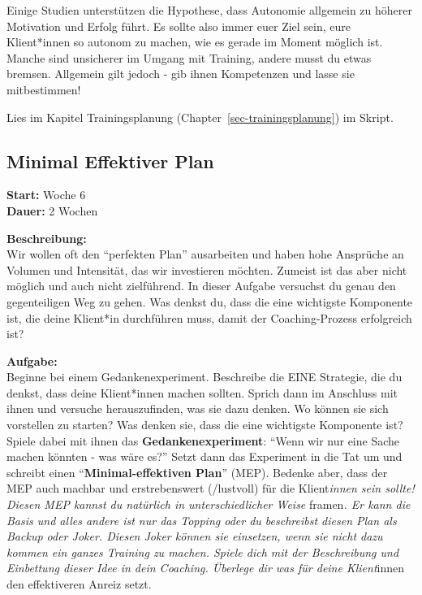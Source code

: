 \documentclass[
  letterpaper,
  DIV=11,
  numbers=noendperiod]{scrreprt}
\begin{document}
Einige Studien unterstützen die Hypothese, dass Autonomie allgemein zu
höherer Motivation und Erfolg führt. Es sollte also immer euer Ziel
sein, eure Klient*innen so autonom zu machen, wie es gerade im Moment
möglich ist. Manche sind unsicherer im Umgang mit Training, andere musst
du etwas bremsen. Allgemein gilt jedoch - gib ihnen Kompetenzen und
lasse sie mitbestimmen!

Lies im Kapitel Trainingsplanung (Chapter~\ref{sec-trainingsplanung}) im
Skript.

\subsection{Minimal Effektiver Plan}\label{minimal-effektiver-plan}

\textbf{Start:} Woche 6\\
\textbf{Dauer:} 2 Wochen

\textbf{Beschreibung:}\\
Wir wollen oft den ``perfekten Plan'' ausarbeiten und haben hohe
Ansprüche an Volumen und Intensität, das wir investieren möchten.
Zumeist ist das aber nicht möglich und auch nicht zielführend. In dieser
Aufgabe versuchst du genau den gegenteiligen Weg zu gehen. Was denkst
du, dass die eine wichtigste Komponente ist, die deine Klient*in
durchführen muss, damit der Coaching-Prozess erfolgreich ist?

\textbf{Aufgabe:}\\
Beginne bei einem Gedankenexperiment. Beschreibe die EINE Strategie, die
du denkst, dass deine Klient*innen machen sollten. Sprich dann im
Anschluss mit ihnen und versuche herauszufinden, was sie dazu denken. Wo
können sie sich vorstellen zu starten? Was denken sie, dass die eine
wichtigste Komponente ist? Spiele dabei mit ihnen das
\textbf{Gedankenexperiment}: ``Wenn wir nur eine Sache machen könnten -
was wäre es?'' Setzt dann das Experiment in die Tat um und schreibt
einen ``\textbf{Minimal-effektiven Plan}'' (MEP). Bedenke aber, dass der
MEP auch machbar und erstrebenswert (/lustvoll) für die
Klient\emph{innen sein sollte! Diesen MEP kannst du natürlich in
unterschiedlicher Weise} framen\emph{. Er kann die Basis und alles
andere ist nur das Topping oder du beschreibst diesen Plan als Backup
oder Joker. Diesen Joker können sie einsetzen, wenn sie nicht dazu
kommen ein ganzes Training zu machen. Spiele dich mit der Beschreibung
und Einbettung dieser Idee in dein Coaching. Überlege dir was für deine
Klient}innen den effektiveren Anreiz setzt.
\end{document}
